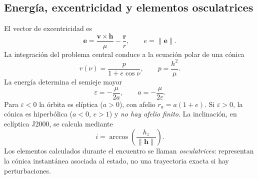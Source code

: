 \documentclass[11pt,a4paper]{article}
\newcommand{\vect}[1]{\bm{#1}}
\begin{document}
\subsection{Energía, excentricidad y elementos osculatrices}
El vector de excentricidad es
\begin{equation}
\vect e=\frac{\vect v\times\vect h}{\mu}-\frac{\vect r}{r},
\qquad e=\lVert\vect e\rVert.
\end{equation}
La integración del problema central conduce a la ecuación polar de una cónica
\begin{equation}\label{eq:conic}
r(\nu)=\frac{p}{1+e\cos\nu},\qquad p=\frac{h^2}{\mu}.
\end{equation}
La energía determina el semieje mayor
\begin{equation}
\varepsilon=-\frac{\mu}{2a},\qquad a=-\frac{\mu}{2\varepsilon}.
\end{equation}
Para $\varepsilon<0$ la órbita es elíptica ($a>0$), con afelio $r_a=a(1+e)$. Si $\varepsilon>0$, la cónica es hiperbólica ($a<0$, $e>1$) y \emph{no hay afelio finito}. La inclinación, en eclíptica J2000, se calcula mediante
\begin{equation}
i=\arccos\left(\frac{h_z}{\lVert\vect h\rVert}\right).
\end{equation}
Los elementos calculados durante el encuentro se llaman \emph{osculatrices}: representan la cónica instantánea asociada al estado, no una trayectoria exacta si hay perturbaciones.
\end{document}
